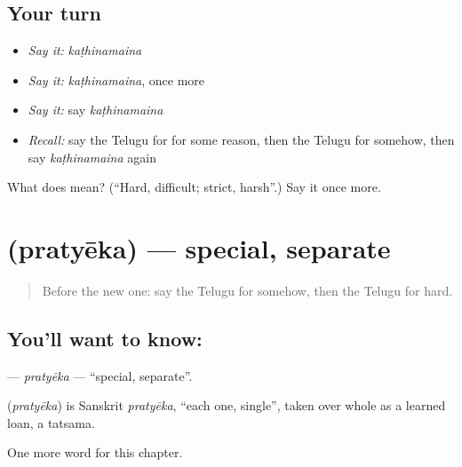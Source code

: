 \subsection*{Your turn}
\begin{itemize}
\raggedright
  \item \emph{Say it:} \emph{kaṭhinamaina}
  \item \emph{Say it:} \emph{kaṭhinamaina}, once more
  \item \emph{Say it:} say \emph{kaṭhinamaina}
  \item \emph{Recall:} say the Telugu for for some reason, then the Telugu for somehow, then say \emph{kaṭhinamaina} again
\end{itemize}

\begin{tcolorbox}[breakable,colback=teal!4,colframe=teal!35!black,title={Before you move on}]
What does  mean? (\textquotedblleft{}Hard, difficult; strict, harsh\textquotedblright{}.) Say it once more.
\end{tcolorbox}
\section[\texorpdfstring{\te{ప్రత్యేక} (pratyēka)}{ప్రత్యేక (pratyēka)}]{ (pratyēka) — special, separate}

\label{lesson:TE-C296-pratyeka}



\begin{quote}
Before the new one: say the Telugu for somehow, then the Telugu for hard.
\end{quote}

\subsection*{You'll want to know: }
\textbf{} — \emph{pratyēka} — \textquotedblleft{}special, separate\textquotedblright{}.

\begin{cousinweb}
\textbf{} (\emph{pratyēka}) is Sanskrit \emph{pratyēka}, \textquotedblleft{}each one, single\textquotedblright{}, taken over whole as a learned loan, a tatsama.
\end{cousinweb}

\begin{grammarlens}[title={What you've built}]
One more word for this chapter.
\end{grammarlens}

